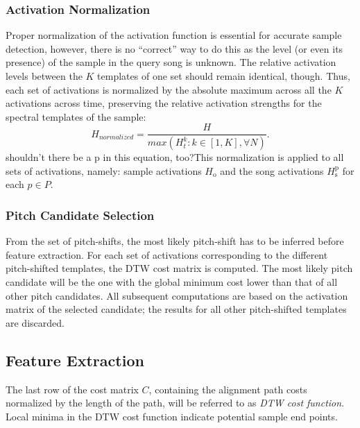 \documentclass{article}
\begin{document}
\subsubsection{Activation Normalization}
Proper normalization of the activation function is essential for accurate sample detection, however, there is no ``correct'' way to do this as the level (or even its presence) of the sample in the query song is unknown. The relative activation levels between the $K$ templates of one set should remain identical, though. Thus, each set of activations is normalized by the absolute maximum across all the $K$ activations across time, preserving the relative activation strengths for the spectral templates of the sample:
%
\begin{equation}
H_{normalized} = \frac{H}{max(H^{k}_{t}: k\in[1,K], \forall N )}.
\end{equation}
%
{\color{red}shouldn't there be a p in this equation, too?}This normalization is applied to all sets of activations, namely: sample activations $H_\mathrm{o}$ and the song activations $H_{\mathrm{s}}^{\mathrm{p}}$ for each $p \in P$.

\subsubsection{Pitch Candidate Selection}
From the set of pitch-shifts, the most likely pitch-shift has to be inferred before feature extraction. For each set of activations corresponding to the different pitch-shifted templates, the DTW cost matrix is computed. The most likely pitch candidate will be the one with the global minimum cost lower than that of all other pitch candidates. All subsequent computations are based on the activation matrix of the selected candidate; the results for all other pitch-shifted templates are discarded.

\subsection{Feature Extraction}
The last row of the cost matrix $C$, containing the alignment path costs normalized by the length of the path, will be referred to as \textit{DTW cost function}. Local minima in the DTW cost function indicate potential sample end points.
\end{document}
